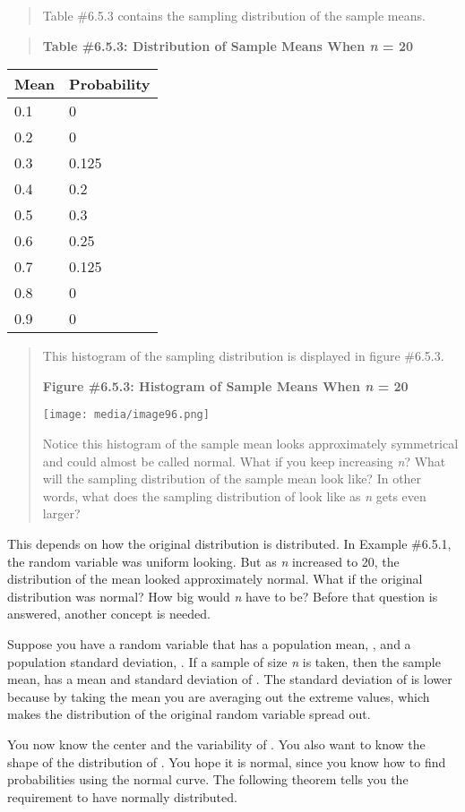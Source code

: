 \documentclass[]{book}
\begin{document}
\begin{quote}
Table \#6.5.3 contains the sampling distribution of the sample means.
\end{quote}

\begin{quote}
\textbf{Table \#6.5.3: Distribution of Sample Means When \emph{n} = 20}
\end{quote}

\begin{longtable}[]{@{}ll@{}}
\toprule
Mean & Probability\tabularnewline
\midrule
\endhead
0.1 & 0\tabularnewline
0.2 & 0\tabularnewline
0.3 & 0.125\tabularnewline
0.4 & 0.2\tabularnewline
0.5 & 0.3\tabularnewline
0.6 & 0.25\tabularnewline
0.7 & 0.125\tabularnewline
0.8 & 0\tabularnewline
0.9 & 0\tabularnewline
\bottomrule
\end{longtable}

\begin{quote}
This histogram of the sampling distribution is displayed in figure
\#6.5.3.

\textbf{Figure \#6.5.3: Histogram of Sample Means When \emph{n} = 20}

\texttt{[image: media/image96.png]}

Notice this histogram of the sample mean looks approximately
symmetrical and could almost be called normal. What if you keep
increasing \emph{n}? What will the sampling distribution of the sample mean
look like? In other words, what does the sampling distribution of look
like as \emph{n} gets even larger?
\end{quote}

This depends on how the original distribution is distributed. In Example
\#6.5.1, the random variable was uniform looking. But as \emph{n} increased
to 20, the distribution of the mean looked approximately normal. What if
the original distribution was normal? How big would \emph{n} have to be?
Before that question is answered, another concept is needed.

Suppose you have a random variable that has a population mean, , and a
population standard deviation, . If a sample of size \emph{n} is taken, then
the sample mean, has a mean and standard deviation of . The standard
deviation of is lower because by taking the mean you are averaging out
the extreme values, which makes the distribution of the original random
variable spread out.

You now know the center and the variability of . You also want to know
the shape of the distribution of . You hope it is normal, since you know
how to find probabilities using the normal curve. The following theorem
tells you the requirement to have normally distributed.
\end{document}
